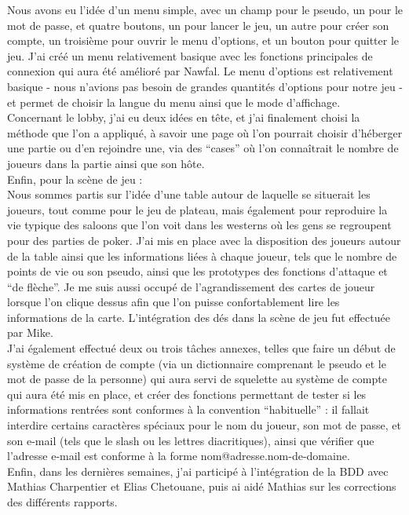 \documentclass[a4paper,11pt]{article}
\begin{document}
    Nous avons eu l’idée d’un menu simple, avec un champ pour le pseudo, un pour le mot de passe, et quatre boutons, un pour lancer le jeu, un autre pour créer son compte, un troisième pour ouvrir le menu d’options, et un bouton pour quitter le jeu. J’ai créé un menu relativement basique avec les fonctions principales de connexion qui aura été amélioré par Nawfal.
    Le menu d’options est relativement basique - nous n’avions pas besoin de grandes quantités d’options pour notre jeu - et permet de choisir la langue du menu ainsi que le mode d’affichage. \\
    Concernant le lobby, j’ai eu deux idées en tête, et j’ai finalement choisi la méthode que l’on a appliqué, à savoir une page où l’on pourrait choisir d’héberger une partie ou d’en rejoindre une, via des “cases” où l’on connaîtrait le nombre de joueurs dans la partie ainsi que son hôte. \\

    Enfin, pour la scène de jeu : \\
    Nous sommes partis sur l’idée d’une table autour de laquelle se situerait les joueurs, tout comme pour le jeu de plateau, mais également pour reproduire la vie typique des saloons que l’on voit dans les westerns où les gens se regroupent pour des parties de poker. J’ai mis en place avec la disposition des joueurs autour de la table ainsi que les informations liées à chaque joueur, tels que le nombre de points de vie ou son pseudo, ainsi que les prototypes des fonctions d’attaque et “de flèche”. Je me suis aussi occupé de l’agrandissement des cartes de joueur lorsque l’on clique dessus afin que l’on puisse confortablement lire les informations de la carte. L’intégration des dés dans la scène de jeu fut effectuée par Mike. \\

    J’ai également effectué deux ou trois tâches annexes, telles que faire un début de système de création de compte (via un dictionnaire comprenant le pseudo et le mot de passe de la personne) qui aura servi de squelette au système de compte qui aura été mis en place, et créer des fonctions permettant de tester si les informations rentrées sont conformes à la convention “habituelle” : il fallait interdire certains caractères spéciaux pour le nom du joueur, son mot de passe, et son e-mail (tels que le slash ou les lettres diacritiques), ainsi que vérifier que l’adresse e-mail est conforme à la forme nom@adresse.nom-de-domaine.\\

    Enfin, dans les dernières semaines, j’ai participé à l’intégration de la BDD avec Mathias Charpentier et Elias Chetouane, puis ai aidé Mathias sur les corrections des différents rapports. \\
\end{document}
